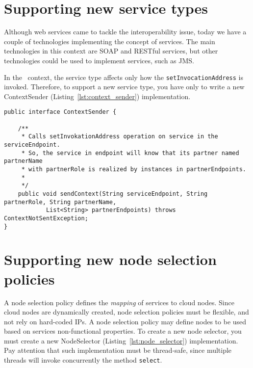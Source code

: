 \section{Supporting new service types}

Although web services came to tackle the interoperability issue, today we have a couple of technologies implementing the concept of services.
The main technologies in this context are SOAP and RESTful services, but other technologies could be used to implement services, such as JMS.

In the \ee\ context, the service type affects only how the \texttt{setInvocationAddress} is invoked.
Therefore, to support a new service type, you have only to write a new \textsf{ContextSender} (Listing~\ref{lst:context_sender}) implementation.

{\footnotesize
\begin{lstlisting}[caption=\textsf{ContextSender} interface, label=lst:context_sender]
public interface ContextSender {

    /**
     * Calls setInvokationAddress operation on service in the serviceEndpoint.
     * So, the service in endpoint will know that its partner named partnerName
     * with partnerRole is realized by instances in partnerEndpoints.
     * 
     */
    public void sendContext(String serviceEndpoint, String partnerRole, String partnerName,
            List<String> partnerEndpoints) throws ContextNotSentException;
}
\end{lstlisting}
}


\section{Supporting new node selection policies}

A node selection policy defines the \emph{mapping} of services to cloud nodes.
Since cloud nodes are dynamically created, node selection policies must be flexible, and not rely on hard-coded IPs.
A node selection policy may define nodes to be used based on services non-functional properties.
To create a new node selector, you must create a new \textsf{NodeSelector} (Listing~\ref{lst:node_selector}) implementation.
Pay attention that such implementation must be thread-safe, since multiple threads will invoke concurrently the method \texttt{select}.

